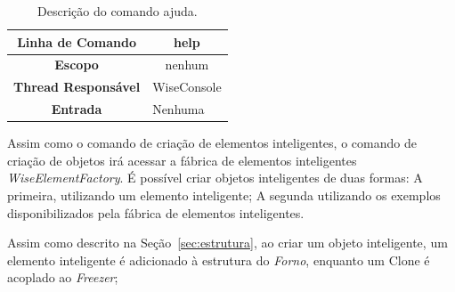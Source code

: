 \documentclass[10pt,aspectratio=169]{beamer}
\theoremstyle{remark}
\theoremstyle{definition}
\begin{document}
\begin{frame}[allowframebreaks]
		
		\begin{center}
			\begin{table}[!htbp]
				\begin{tabular}{|c|m{}|}
					\hline
					\textbf{Linha de Comando} & \multicolumn{1}{c|}{help} \\
					\hline
					\textbf{Escopo} & \multicolumn{1}{c|}{nenhum} \\
					\hline
					\textbf{Thread Responsável} & \multicolumn{1}{c|}{WiseConsole} \\
					\hline
					\textbf{Entrada} & Nenhuma \\
					\hline
				\end{tabular}
				\caption{Descrição do comando ajuda.}
				\label{tab:help}
			\end{table}
		\end{center}
	
		\framebreak
	
		Assim como o comando de criação de elementos inteligentes, o comando de criação de objetos irá acessar a fábrica de elementos inteligentes \textit{WiseElementFactory}. É possível criar objetos inteligentes de duas formas: A primeira, utilizando um elemento inteligente; A segunda utilizando os exemplos disponibilizados pela fábrica de elementos inteligentes.
		
		Assim como descrito na Seção~\ref{sec:estrutura}, ao criar um objeto inteligente, um elemento inteligente é adicionado à estrutura do \textit{Forno}, enquanto um Clone é acoplado ao \textit{Freezer};
		

\end{frame}
\end{document}
